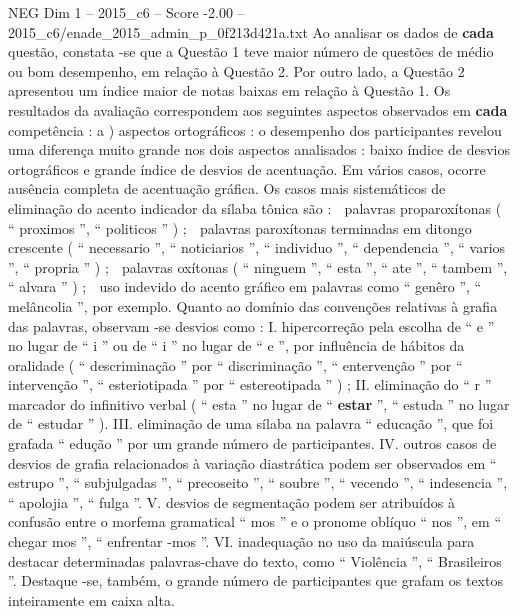 \begin{textsample}{NEG Dim 1 – 2015\_c6 – Score -2.00 – 2015\_c6/enade\_2015\_admin\_p\_0f213d421a.txt}
Ao analisar os dados de \textbf{cada} questão, constata -se que a Questão 1 teve maior número de questões de médio ou bom desempenho, em relação à Questão 2.
Por outro lado, a Questão 2 apresentou um índice maior de notas baixas em relação à Questão 1.
Os resultados da avaliação correspondem aos seguintes aspectos observados em \textbf{cada} competência : a ) aspectos ortográficos : o desempenho dos participantes revelou uma diferença muito grande nos dois aspectos analisados : baixo índice de desvios ortográficos e grande índice de desvios de acentuação.
Em vários casos, ocorre ausência completa de acentuação gráfica.
Os casos mais sistemáticos de eliminação do acento indicador da sílaba tônica são :  palavras proparoxítonas ( “ proximos ”, “ politicos ” ) ;  palavras paroxítonas terminadas em ditongo crescente ( “ necessario ”, “ noticiarios ”, “ individuo ”, “ dependencia ”, “ varios ”, “ propria ” ) ;  palavras oxítonas ( “ ninguem ”, “ esta ”, “ ate ”, “ tambem ”, “ alvara ” ) ;  uso indevido do acento gráfico em palavras como “ genêro ”, “ melâncolia ”, por exemplo.
Quanto ao domínio das convenções relativas à grafia das palavras, observam -se desvios como : I. hipercorreção pela escolha de “ e ” no lugar de “ i ” ou de “ i ” no lugar de “ e ”, por influência de hábitos da oralidade ( “ descriminação ” por “ discriminação ”, “ entervenção ” por “ intervenção ”, “ esteriotipada ” por “ estereotipada ” ) ; II. eliminação do “ r ” marcador do infinitivo verbal ( “ esta ” no lugar de “ \textbf{estar} ”, “ estuda ” no lugar de “ estudar ” ).
III. eliminação de uma sílaba na palavra “ educação ”, que foi grafada “ edução ” por um grande número de participantes.
IV. outros casos de desvios de grafia relacionados à variação diastrática podem ser observados em “ estrupo ”, “ subjulgadas ”, “ precoseito ”, “ soubre ”, “ vecendo ”, “ indesencia ”, “ apolojia ”, “ fulga ”.
V. desvios de segmentação podem ser atribuídos à confusão entre o morfema gramatical “ mos ” e o pronome oblíquo “ nos ”, em “ chegar mos ”, “ enfrentar -mos ”.
VI. inadequação no uso da maiúscula para destacar determinadas palavras-chave do texto, como “ Violência ”, “ Brasileiros ”.
Destaque -se, também, o grande número de participantes que grafam os textos inteiramente em caixa alta.

\end{textsample}
